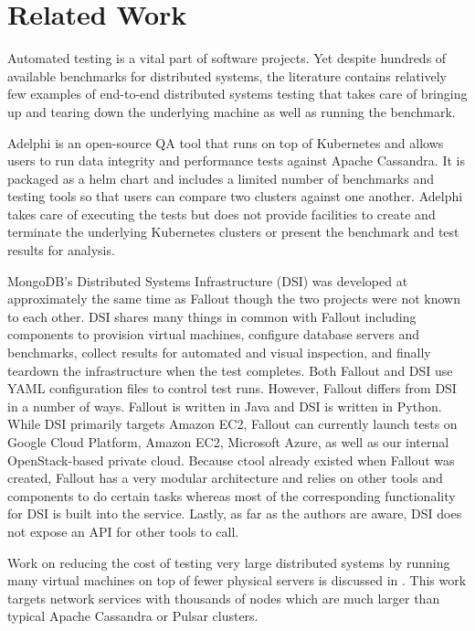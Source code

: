 \documentclass[a4paper,fleqn]{cas-dc}
\begin{document}
\section{Related Work}\label{related}

Automated testing is a vital part of software projects. Yet despite hundreds of
available benchmarks for distributed systems, the literature contains relatively few examples of
end-to-end distributed systems testing that takes care of bringing up and tearing down the
underlying machine as well as running the benchmark.

Adelphi \cite{ADELPHI} is an open-source QA tool that runs on top of Kubernetes and allows users to run
data integrity and performance tests against Apache Cassandra. It is packaged as a helm chart and
includes a limited number of benchmarks and testing tools so that users can compare two clusters
against one another. Adelphi takes care of executing the tests but does not provide facilities to
create and terminate the underlying Kubernetes clusters or present the benchmark and test results
for analysis.

MongoDB’s Distributed Systems Infrastructure (DSI) \cite{DSI} was developed at approximately the same
time as Fallout though the two projects were not known to each other. DSI shares many things in
common with Fallout including components to provision virtual machines, configure database servers
and benchmarks, collect results for automated and visual inspection, and finally teardown the
infrastructure when the test completes. Both Fallout and DSI use YAML configuration files to control
test runs. However, Fallout differs from DSI in a number of ways. Fallout is written in Java and
DSI is written in Python. While DSI primarily targets Amazon EC2, Fallout can currently launch tests
on Google Cloud Platform, Amazon EC2, Microsoft Azure, as well as our internal OpenStack-based
private cloud. Because ctool already existed when Fallout was created, Fallout has a very modular
architecture and relies on other tools and components to do certain tasks whereas most of the
corresponding functionality for DSI is built into the service. Lastly, as far as the authors are
aware, DSI does not expose an API for other tools to call.

Work on reducing the cost of testing very large distributed systems by running many virtual machines
on top of fewer physical servers is discussed in \cite{DIECAST}. This work targets network services with
thousands of nodes which are much larger than typical Apache Cassandra or Pulsar clusters.
\end{document}
